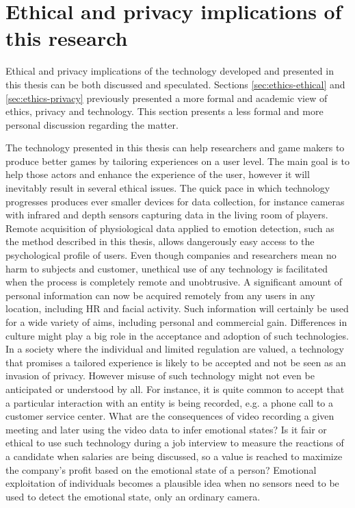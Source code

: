 \section{Ethical and privacy implications of this research}
\label{sec:ethics-implications}

Ethical and privacy implications of the technology developed and presented in this thesis can be both discussed and speculated. Sections \ref{sec:ethics-ethical} and \ref{sec:ethics-privacy} previously presented a more formal and academic view of ethics, privacy and technology. This section presents a less formal and more personal discussion regarding the matter.

The technology presented in this thesis can help researchers and game makers to produce better games by tailoring experiences on a user level. The main goal is to help those actors and enhance the experience of the user, however it will inevitably result in several ethical issues. The quick pace in which technology progresses produces ever smaller devices for data collection, for instance cameras with infrared and depth sensors capturing data in the living room of players. Remote acquisition of physiological data applied to emotion detection, such as the method described in this thesis, allows dangerously easy access to the psychological profile of users. Even though companies and researchers mean no harm to subjects and customer, unethical use of any technology is facilitated when the process is completely remote and unobtrusive. A significant amount of personal information can now be acquired remotely from any users in any location, including HR and facial activity. Such information will certainly be used for a wide variety of aims, including personal and commercial gain. Differences in culture might play a big role in the acceptance and adoption of such technologies. In a society where the individual and limited regulation are valued, a technology that promises a tailored experience is likely to be accepted and not be seen as an invasion of privacy. However misuse of such technology might not even be anticipated or understood by all. For instance, it is quite common to accept that a particular interaction with an entity is being recorded, e.g. a phone call to a customer service center. What are the consequences of video recording a given meeting and later using the video data to infer emotional states? Is it fair or ethical to use such technology during a job interview to measure the reactions of a candidate when salaries are being discussed, so a value is reached to maximize the company's profit based on the emotional state of a person? Emotional exploitation of individuals becomes a plausible idea when no sensors need to be used to detect the emotional state, only an ordinary camera.

